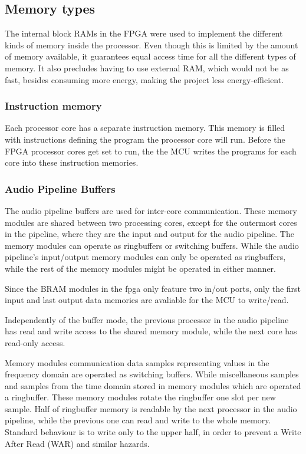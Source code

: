 
\subsection{Memory types}\label{subsec:fpga-memory}

The internal block RAMs in the FPGA were used to implement the different kinds
of memory inside the processor. Even though this is limited by the amount of
memory available, it guarantees equal access time for all the different types
of memory. It also precludes having to use external RAM, which would not be as
fast, besides consuming more energy, making the project less energy-efficient.

\subsubsection{Instruction memory}
Each processor core has a separate instruction memory. This memory is filled
with instructions defining the program the processor core will run. Before the
FPGA processor cores get set to run, the the MCU writes the programs for each
core into these instruction memories.

\subsubsection{Audio Pipeline Buffers}
The audio pipeline buffers are used for inter-core communication. These memory
modules are shared between two processing cores, except for the outermost cores
in the pipeline, where they are the input and output for the audio pipeline. The
memory modules can operate as ringbuffers or switching buffers. While the audio
pipeline's input/output memory modules can only be operated as ringbuffers,
while the rest of the memory modules might be operated in either manner.

Since the BRAM modules in the fpga only feature two in/out ports, only the
first input and last output data memories are avaliable for the MCU to
write/read.

Independently of the buffer mode, the previous processor in the audio pipeline
has read and write access to the shared memory module, while the next core has
read-only access.

Memory modules communication data samples representing values in the frequency
domain are operated as switching buffers. While miscellaneous samples and
samples from the time domain stored in memory modules which are operated a
ringbuffer. These memory modules rotate the ringbuffer one slot per new sample.
Half of ringbuffer memory is readable by the next processor in the audio
pipeline, while the previous one can read and write to the whole memory.
Standard behaviour is to write only to the upper half, in order to prevent a
Write After Read (WAR) and similar hazards.

